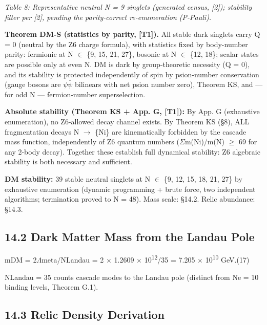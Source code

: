 \documentclass[11pt,letterpaper]{article}
\begin{document}
\begingroup\centering\footnotesize\itshape Table 8: Representative neutral N = 9 singlets (generated census,  [2]); stability filter per [2], pending the parity-correct re-enumeration (P-Pauli).\par\endgroup

\noindent \textbf{Theorem DM-S (statistics by parity, [T1]). }All stable dark singlets carry Q = 0 (neutral by the Z6 charge formula), with statistics fixed by body-number parity: fermionic at N $\in$ \{9, 15, 21, 27\}, bosonic at N $\in$ \{12, 18\}; scalar states are possible only at even N. DM is dark by group-theoretic necessity (Q = 0), and its stability is protected independently of spin by psion-number conservation (gauge bosons are $\psi$$\bar{\psi}$ bilinears with net psion number zero), Theorem KS, and --- for odd N --- fermion-number superselection.

\noindent \textbf{Absolute stability (Theorem KS + App. G, [T1]): }By App. G (exhaustive enumeration), no Z6-allowed decay channel exists. By Theorem KS (§8), ALL fragmentation decays N $\to$ \{Ni\} are kinematically forbidden by the cascade mass function, independently of Z6 quantum numbers ($\Sigma$m(Ni)/m(N) $\ge$ 69 for any 2-body decay). Together these establish full dynamical stability: Z6 algebraic stability is both necessary and sufficient.

\noindent \textbf{DM stability: }39 stable neutral singlets at N $\in$ \{9, 12, 15, 18, 21, 27\} by exhaustive enumeration (dynamic programming + brute force, two independent algorithms; termination proved to N = 48). Mass scale: §14.2. Relic abundance: §14.3.

\subsection*{14.2  Dark Matter Mass from the Landau Pole}

\begingroup\centering mDM = 2$\Lambda$meta/NLandau = 2 $\times$ 1.2609 $\times$ 10\textsuperscript{12}/35 = 7.205 $\times$ 10\textsuperscript{10} GeV.\hspace{2em}(17)\par\endgroup

\noindent NLandau = 35 counts cascade modes to the Landau pole (distinct from Ne = 10 binding levels, Theorem G.1).

\subsection*{14.3  Relic Density Derivation}
\end{document}
